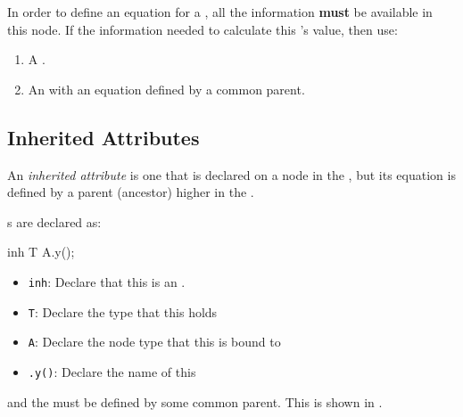 In order to define an equation for a , all the information \textbf{must} be available in this node.
If the information needed to calculate this 's value, then use:
\begin{enumerate}[noitemsep]
\item A .
\item An  with an equation defined by a common parent.
\end{enumerate}

\subsection{Inherited Attributes}\label{subsec:Inherited_Attributes}
\begin{definition}\label{def:Inherited_Attribute}
  An \emph{inherited attribute} is one that is declared on a node in the , but its equation is defined by a parent (ancestor) higher in the .

  s are declared as:
\begin{javasource}
  inh T A.y();
\end{javasource}
  \begin{itemize}[noitemsep]
  \item \texttt{inh}: Declare that this  is an .
  \item \texttt{T}: Declare the type that this  holds
  \item \texttt{A}: Declare the  node type that this  is bound to
  \item \texttt{.y()}: Declare the name of this 
  \end{itemize}

  and the  must be defined by some common parent.
  This is shown in .
\end{definition}

